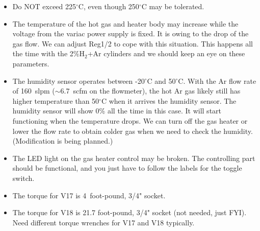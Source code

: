 \documentclass[letterpaper,11pt]{article}
\newcommand{\Hydro}     {H$_2$}
\newcommand{\dC}        {$^\circ$C}
\begin{document}
\begin{itemize}
\item Do NOT exceed 225{\dC}, even though 250{\dC} may be tolerated.
\item The temperature of the hot gas and heater body may increase while the voltage 
from the variac power supply is fixed.  
It is owing to the drop of the gas flow.  We can adjust Reg1/2 to cope with this situation.
This happens all the time with the 2\%{\Hydro}+Ar cylinders and we should keep an eye on 
these parameters.
\item The humidity sensor operates between -20{\dC} and 50{\dC}.
With the Ar flow rate of 160~slpm ($\sim$6.7~scfm on the flowmeter), the hot Ar gas likely 
still has higher temperature than 50{\dC} when it arrives the humidity sensor.
The humidity sensor will show 0\% all the time in this case.
It will start functioning when the temperature drops.
We can turn off the gas heater or lower the flow rate to obtain colder gas when we need to
check the humidity.
(Modification is being planned.)
\item The LED light on the gas heater control may be broken.  The controlling part 
should be functional, and you just have to follow the labels for the toggle switch.
\item The torque for V17 is 4~foot-pound, 3/4" socket.
\item The torque for V18 is 21.7 foot-pound, 3/4" socket (not needed, just FYI).  
Need different torque wrenches for V17 and V18 typically.
\end{itemize}
\end{document}

